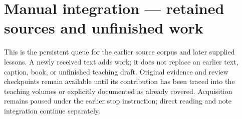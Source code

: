 \hypertarget{appendix-ac1f51db5e9a}{}\label{referencestart:appendix-ac1f51db5e9a}
\section{Manual integration --- retained sources and unfinished work}\label{appendix-ac1f51db5e9a-manual-integration-retained-sources-and-unfinished-work}

This is the persistent queue for the earlier source corpus and later supplied lessons. A newly received text adds work; it does not replace an earlier text, caption, book, or unfinished teaching draft. Original evidence and review checkpoints remain available until its contribution has been traced into the teaching volumes or explicitly documented as already covered. Acquisition remains paused under the earlier stop instruction; direct reading and note integration continue separately.

